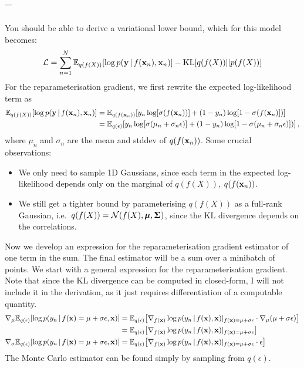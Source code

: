 \documentclass[a4paper]{article}
\newcommand{\mat}[1]{{\boldsymbol{{#1}}}} %
\newcommand{\questionref}[1]{\Cref{#1} -- \nameref{#1}}
\newcommand{\lb}{\mathcal{L}}
\theoremstyle{definition}
\begin{document}
\subsection{\questionref{q:gradients}}
You should be able to derive a variational lower bound, which for this model becomes:
\begin{align}
\lb = \sum_{n=1}^N\Exp{q(f(X))}{\log p(\vy\given f(\vx_n), \vx_n)} - \KL{q(f(X))}{p(f(X))}
\end{align}
For the reparameterisation gradient, we first rewrite the expected log-likelihood term as
\begin{align}
\Exp{q(f(X))}{\log p(\vy\given f(\vx_n), \vx_n)} &= \Exp{q(f(\vx_n))}{y_n\log [\sigma(f(\vx_n))] + (1-y_n)\log[1-\sigma(f(\vx_n)])} \\
&= \Exp{q(\epsilon)}{y_n\log [\sigma(\mu_n + \sigma_n\epsilon)] + (1-y_n)\log[1-\sigma(\mu_n + \sigma_n\epsilon)])} \,,
\end{align}
where $\mu_n$ and $\sigma_n$ are the mean and stddev of $q(f(\mathbf{x}_n))$. Some crucial observations:
\begin{itemize}
\item We only need to sample 1D Gaussians, since each term in the expected log-likelihood depends only on the marginal of $q(f(X))$, $q(f(\mathbf{x}_n))$.
\item We still get a tighter bound by parameterising $q(f(X))$ as a full-rank Gaussian, i.e.~$q(f(X)) = \NormDist{f(X), \vmu, \mat\Sigma}$, since the KL divergence depends on the correlations.
\end{itemize}

Now we develop an expression for the reparameterisation gradient estimator of one term in the sum. The final estimator will be a sum over a minibatch of points. We start with a general expression for the reparameterisation gradient. Note that since the KL divergence can be computed in closed-form, I will not include it in the derivation, as it just requires differentiation of a computable quantity.
\begin{align}
\nabla_\mu\Exp{q(\epsilon)}{\log p(y_n\given f(\vx)= \mu + \sigma\epsilon, \vx)} &= \Exp{q(\epsilon)}{\nabla_{f(\vx)}\log p(y_n\given f(\vx), \vx)\vert_{f(\vx) = \mu+\sigma\epsilon}\cdot\nabla_{\mu}(\mu+\sigma\epsilon)} \\
&=\Exp{q(\epsilon)}{\nabla_{f(\vx)}\log p(y_n\given f(\vx), \vx)\vert_{f(\vx) = \mu+\sigma\epsilon}} \\
\nabla_\sigma\Exp{q(\epsilon)}{\log p(y_n\given f(\vx)= \mu + \sigma\epsilon, \vx)} &= \Exp{q(\epsilon)}{\nabla_{f(\vx)}\log p(y_n\given f(\vx), \vx)\vert_{f(\vx) = \mu+\sigma\epsilon}\cdot\epsilon}%
\end{align}
The Monte Carlo estimator can be found simply by sampling from $q(\epsilon)$.
\end{document}
